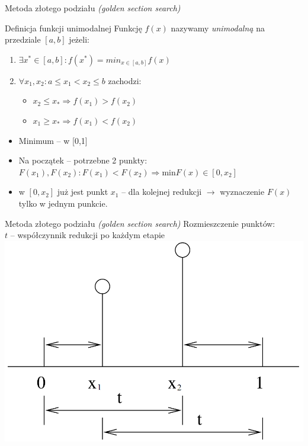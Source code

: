   \begin{frame}{Metoda złotego podziału \emph{(golden section search)}}
    \begin{block}{Definicja funkcji unimodalnej}
      Funkcję $f(x)$ nazywamy \emph{unimodalną} na przedziale
      $[a{,}b]$ jeżeli:
      \begin{enumerate}
        \item $\exists x^{*}\in [a{,}b] : f(x^{*}) = min_{x \in [a{,}b]}f(x)$
        \item $\forall x_{1}{,}x_{2} : a \leq x_{1} < x_{2} \leq b$ zachodzi:
        \begin{itemize}
          \item $x_{2} \leq x_{*} \Rightarrow f(x_{1}) > f(x_{2})$
          \item $x_{1} \geq x_{*} \Rightarrow f(x_{1}) < f(x_{2})$
        \end{itemize}
      \end{enumerate}
    \end{block}
    \begin{itemize}
      \item Minimum -- w [0,1]
      \item Na początek -- potrzebne 2 punkty:
      $F(x_1),F(x_2) : F(x_1) < F(x_2) \Rightarrow \text{min} F(x)\in [0{,}x_2]$
      \item w $[0{,}x_2]$ już jest punkt $x_1$ -- dla kolejnej
      redukcji $\to$ wyznaczenie $F(x)$ tylko w jednym punkcie.
    \end{itemize}

  \end{frame}

  \begin{frame}{Metoda złotego podziału \emph{(golden section search)}}
    Rozmieszczenie punktów:\\
    $t$ -- współczynnik redukcji po każdym etapie\\
    \centering
    \includegraphics[height=0.6\textheight]{img/17/f_uni2}
  \end{frame}

